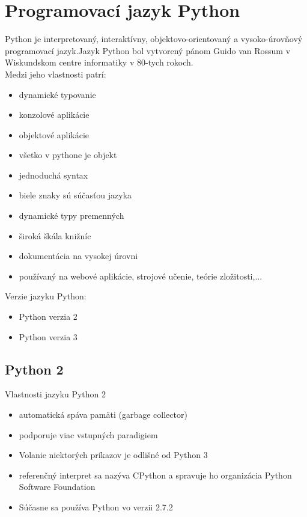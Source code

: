 \chapter{Programovací jazyk Python}
Python je interpretovaný, interaktívny, objektovo-orientovaný a vysoko-úrovňový programovací jazyk.Jazyk Python bol vytvorený pánom  Guido van Rossum v Wiskundskom centre informatiky v 80-tych rokoch. \\
Medzi jeho vlastnosti patrí:\begin{itemize}
\item dynamické typovanie
\item konzolové aplikácie
\item objektové aplikácie
\item všetko v pythone je objekt
\item jednoduchá syntax
\item biele znaky sú súčasťou jazyka
\item dynamické typy premenných
\item široká škála knižníc
\item dokumentácia na vysokej úrovni\
\item používaný  na webové aplikácie, strojové učenie, teórie zložitosti,...
\end{itemize}
Verzie jazyku Python:\begin{itemize}
\item Python verzia 2
\item Python verzia 3
\end{itemize}
\section{Python 2}
Vlastnosti jazyku Python 2\cite{Python2}
\begin{itemize}
\item automatická spáva pamäti (garbage collector)
\item podporuje viac vstupných paradigiem
\item Volanie niektorých príkazov je odlišné od Python 3
\item referenčný interpret sa nazýva CPython a spravuje ho organizácia Python Software Foundation
\item Súčasne sa používa Python vo verzii 2.7.2
\end{itemize}
